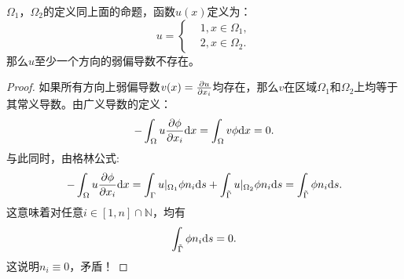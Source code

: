     \begin{proposition}
        $\Omega_{1}$，$\Omega_{2}$的定义同上面的命题，函数$u(x)$定义为：
        \begin{equation}
            u=\left\{
                \begin{aligned}
                    &1,x\in\Omega_{1},\\
                    &2,x\in\Omega_{2}.
                \end{aligned}
            \right.
        \end{equation}
        那么$u$至少一个方向的弱偏导数不存在。
    \end{proposition}
\begin{proof}
    如果所有方向上弱偏导数$v(x)=\frac{\partial u}{\partial x_{i}}$均存在，那么$v$在区域$\Omega_{1}$和$\Omega_{2}$上均等于其常义导数。由广义导数的定义：
    \begin{equation}
        -\int_{\Omega}u\frac{\partial \phi}{\partial x_{i}}\mathrm{d} x=\int_{\Omega}v\phi\mathrm{d} x=0.
    \end{equation}
    与此同时，由格林公式:
    \begin{equation}
        -\int_{\Omega}u\frac{\partial \phi}{\partial x_{i}}\mathrm{d} x=\int_{\Gamma}u|_{\Omega_{1}}\phi n_{i}\mathrm{d} s+\int_{\tilde{\Gamma}}u|_{\Omega_{2}}\phi n_{i}\mathrm{d} s=\int_{\tilde{\Gamma}}\phi n_{i}\mathrm{d} s.
    \end{equation}
    这意味着对任意$i\in [1,n]\cap\mathbb{N}$，均有
    \begin{equation}
        \int_{\tilde{\Gamma}}\phi n_{i}\mathrm{d} s=0.
    \end{equation}
    这说明$n_{i}\equiv 0$，矛盾！
\end{proof}
